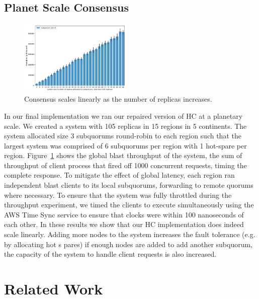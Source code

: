 \documentclass[10pt,conference]{IEEEtran}
\begin{document}
\subsection{Planet Scale Consensus}
\label{section:scaling}

\begin{figure}
    \centering
    \includegraphics[width=0.48\textwidth]{figures/geoconsensus_throughput}
    \caption{Consensus scales linearly as the number of replicas increases.}
    \label{fig:geoconsensus_throughput}
\end{figure}

In our final implementation we ran our repaired version of HC at a planetary scale.
We created a system with 105 replicas in 15 regions in 5 continents.
The system allocated size 3 subquorums round-robin to each region such that the largest
system was comprised of 6 subquorums per region with 1 hot-spare per region.
Figure~\ref{fig:geoconsensus_throughput} shows the global blast throughput of
the system, the sum of throughput of client process that fired off 1000 concurrent
requests, timing the complete response.
To mitigate the effect of global latency, each region ran independent blast clients to
its local subquorums, forwarding to remote quorums where necessary.
To ensure that the system was fully throttled during the throughput experiment, we timed
the clients to execute simultaneously using the AWS Time Sync service to ensure that
clocks were within 100 nanoseconds of each other.
In these results we show that our HC implementation does indeed scale linearly.
Adding more nodes to the system increases the fault tolerance (e.g. by allocating hot s
pares) if enough nodes are added to add another subquorum, the capacity of the system to
handle client requests is also increased.

\section{Related Work}
\label{section:related}

\end{document}
